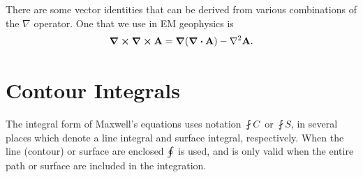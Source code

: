 There are some vector identities that can be derived from various combinations of
the $\nabla$ operator.  One that we use in EM geophysics is
\begin{equation}
    \curl \curl \vb{A} = \grad(\div \vb{A}) - \nabla^{2} \vb{A}.
    \label{eq-curlcurl}
\end{equation}

\section{Contour Integrals} \label{apx:cintegral}
The integral form of Maxwell's equations uses notation $\fint{C}{}$\ or
$\fint{S}{}$, in several places which denote a line integral and surface
integral, respectively.  When the line (contour) or surface are enclosed
$\oint_{}$\ is used, and is only valid when the entire path or surface are
included in the integration.



